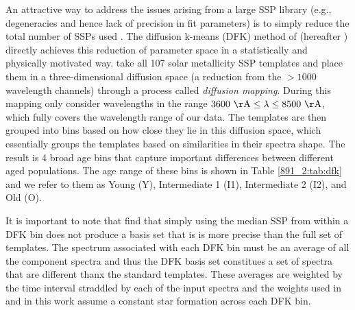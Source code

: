 An attractive way to address the issues arising from a large SSP
library (e.g., degeneracies and hence lack of precision in fit
parameters) is to simply reduce the total number of SSPs used
\citep[e.g.,][]{Tremonti04, CidFernandes05, Tojeiro07}.
The diffusion k-means (DFK) method of \citet{Mosby15} (hereafter
) directly achieves this reduction of parameter
space in a statistically and physically motivated
way.  take all 107 solar metallicity
 SSP templates and place them in a
three-dimensional diffusion space (a reduction from the $> 1000$
wavelength channels) through a process called \emph{diffusion
  mapping}. During this mapping  only consider
wavelengths in the range
$\val{3600}{\AA}\leq\lambda\leq\val{8500}{\AA}$, which fully covers
the wavelength range of our \GP data. The templates are then grouped
into bins based on how close they lie in this diffusion space, which
essentially groups the templates based on similarities in their
spectra shape. The result is 4 broad age bins that capture important
differences between different aged populations. The age range of these
bins is shown in Table \ref{891_2:tab:dfk} and we refer to them as Young
(Y), Intermediate 1 (I1), Intermediate 2 (I2), and Old (O).

It is important to note that  find that simply
using the median  SSP from within a DFK bin does
not produce a basis set that is is more precise than the full set of
 templates. The spectrum associated with each
DFK bin must be an average of all the component spectra and thus the
DFK basis set constitues a set of spectra that are different thanx the
standard  templates. These averages are weighted
by the time interval straddled by each of the input
 spectra and the weights used in
 and in this work assume a constant star formation
across each DFK bin.

